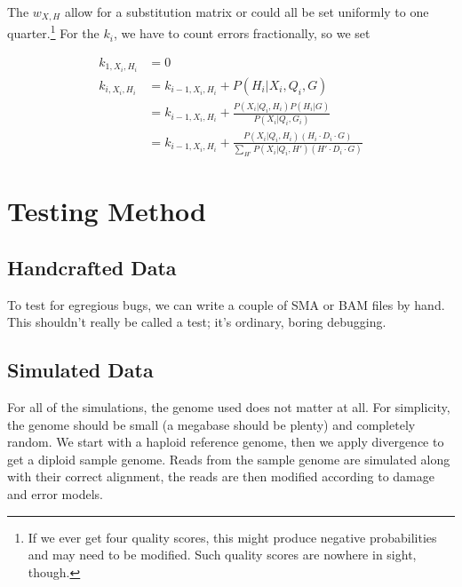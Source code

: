 \documentclass{article}
\begin{document}
The $w_{X,H}$ allow for a substitution matrix or could all be set uniformly to
one quarter.\footnote{If we ever get four quality scores, this might produce
negative probabilities and may need to be modified.  Such quality scores are
nowhere in sight, though.}  For the $k_i$, we have to count errors
fractionally, so we set

\begin{align*}
k_{1,X_i,H_i} &= 0 \\
k_{i,X_i,H_i} &= k_{i-1,X_i,H_i} + P(H_i | X_i, Q_i, G) \\
&= k_{i-1,X_i,H_i} + \frac{P(X_i | Q_i, H_i) P(H_i | G)}{P(X_i|Q_i, G_i)} \\
&= k_{i-1,X_i,H_i} + \frac{P(X_i | Q_i, H_i) \left( H_i \cdot D_i \cdot G \right) }
    {\sum_{H'} P(X_i| Q_i, H') \left( H' \cdot D_i \cdot G \right)}
\end{align*}


\section{Testing Method}

\subsection{Handcrafted Data}

To test for egregious bugs, we can write a couple of SMA or BAM files by
hand.  This shouldn't really be called a test; it's ordinary, boring
debugging.

\subsection{Simulated Data}

For all of the simulations, the genome used does not matter at all.  For
simplicity, the genome should be small (a megabase should be plenty) and
completely random.  We start with a haploid reference genome, then we
apply divergence to get a diploid sample genome.  Reads from the sample
genome are simulated along with their correct alignment, the reads are
then modified according to damage and error models.

\end{document}
